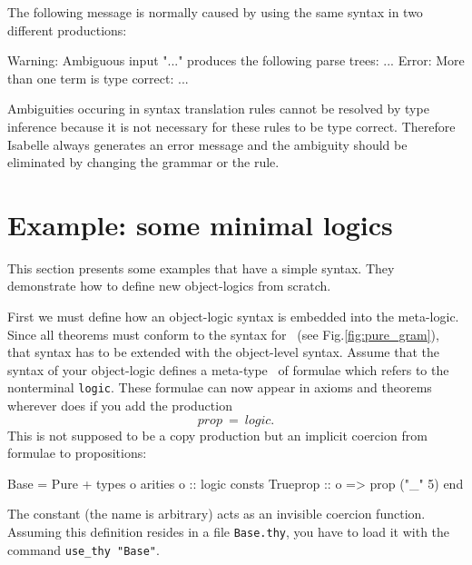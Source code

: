 The following message is normally caused by using the same
syntax in two different productions:

\begin{ttbox}
{\out Warning: Ambiguous input "..."}
{\out produces the following parse trees:}
{\out ...}
{\out Error: More than one term is type correct:}
{\out ...}
\end{ttbox}

Ambiguities occuring in syntax translation rules cannot be resolved by
type inference because it is not necessary for these rules to be type
correct. Therefore Isabelle always generates an error message and the
ambiguity should be eliminated by changing the grammar or the rule.


\section{Example: some minimal logics} \label{sec:min_logics}

This section presents some examples that have a simple syntax.  They
demonstrate how to define new object-logics from scratch.

First we must define how an object-logic syntax is embedded into the
meta-logic.  Since all theorems must conform to the syntax for~
(see Fig.\ts\ref{fig:pure_gram}), that syntax has to be extended with the
object-level syntax.  Assume that the syntax of your object-logic defines a
meta-type~ of formulae which refers to the nonterminal {\tt logic}.
These formulae can now appear in axioms and theorems wherever  does
if you add the production
\[ prop ~=~ logic. \]
This is not supposed to be a copy production but an implicit coercion from
formulae to propositions:
\begin{ttbox}
Base = Pure +
types
  o
arities
  o :: logic
consts
  Trueprop :: o => prop   ("_" 5)
end
\end{ttbox}
The constant  (the name is arbitrary) acts as an invisible
coercion function.  Assuming this definition resides in a file {\tt Base.thy},
you have to load it with the command {\tt use_thy "Base"}.

